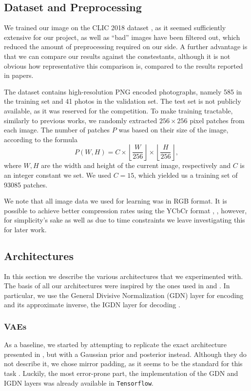 \documentclass{article}
\begin{document}
\subsection{Dataset and Preprocessing}
\label{sec:dataset_preproc}
\par
We trained our image on the CLIC 2018 dataset \cite{clic2018}, as it seemed
sufficiently extensive for our project, as well as ``bad'' images have been
filtered out, which reduced the amount of preprocessing required on our side.
A further advantage is that we can compare our results against the constestants,
although it is not obvious how representative this comparison is, compared to
the results reported in papers.
\par
The dataset contains high-resolution PNG encoded photographs, namely 585 in the
training set and 41 photos in the validation set. The test set is not
publicly available, as it was reserved for the competition. 
To make training tractable, similarly to previous works, we randomly extracted
$256 \times 256$ pixel patches from each image. The number of patches $P$ was
based on their size of the image, according to the formula
\[
  P(W, H) = C \times \left \lfloor \frac{W}{256} \right \rfloor \times
  \left \lfloor \frac{H}{256} \right \rfloor,
\]
where $W, H$ are the width and height of the current image, respectively and $C$
is an integer constant we set. We used $C = 15$, which yielded us a training set
of 93085 patches.
\par
We note that all image data we used for learning was in RGB format. It is
possible to achieve better compression rates using the YCbCr format
\cite{balle2016end}, \cite{rippel2017real}, however, for simplicity's sake as
well as due to time constraints we leave investigating this for later work.
\subsection{Architectures}
\label{sec:architectures}
\par
In this section we describe the various architectures that we experimented with.
The basis of all our architectures were inspired by the ones used in
\cite{balle2016end} and \cite{balle2018variational}. In particular, we use the
General Divisive Normalization (GDN) layer for encoding and its approximate
inverse, the IGDN layer for decoding \cite{balle2015density} \cite{balle2016end}.

\subsubsection{VAEs}
\par
As a baseline, we started by attempting to replicate the exact architecture
presented in \cite{balle2016end}, but with a Gaussian prior and posterior
instead. Although they do not describe it, we chose mirror padding, as it seems
to be the standard for this task \cite{theis2017lossy}. Luckily, the most
error-prone part, the implementation of the GDN and IGDN layers was already
available in \texttt{Tensorflow}\footnotemark.
\end{document}
